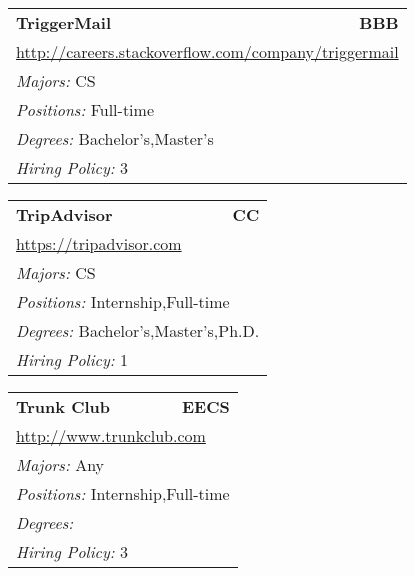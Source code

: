 \documentclass[twoside]{article}
\begin{document}
\begin{center}
\begin{multicols}{3}
\begin{FlushLeft}
\begin{minipage}{.9\columnwidth}
\end{minipage}
 
\begin{minipage}{.9\columnwidth}\begin{tabularx}{.95\columnwidth}{Xr}
                 {\Large\bf TriggerMail} & {\Large\bf BBB}\\
    \multicolumn{2}{p{.95\columnwidth}}{\url{http://careers.stackoverflow.com/company/triggermail}}\\
    \multicolumn{2}{p{.95\columnwidth}}{\emph{Majors:} CS}\\
    \multicolumn{2}{p{.95\columnwidth}}{\emph{Positions:} Full-time}\\
    \multicolumn{2}{p{.95\columnwidth}}{\emph{Degrees:} Bachelor's,Master's}\\
    \multicolumn{2}{p{.95\columnwidth}}{\emph{Hiring Policy:} 3}\\
    \end{tabularx}
    
\end{minipage}
 
\begin{minipage}{.9\columnwidth}\begin{tabularx}{.95\columnwidth}{Xr}
                 {\Large\bf TripAdvisor} & {\Large\bf CC}\\
    \multicolumn{2}{p{.95\columnwidth}}{\url{https://tripadvisor.com}}\\
    \multicolumn{2}{p{.95\columnwidth}}{\emph{Majors:} CS}\\
    \multicolumn{2}{p{.95\columnwidth}}{\emph{Positions:} Internship,Full-time}\\
    \multicolumn{2}{p{.95\columnwidth}}{\emph{Degrees:} Bachelor's,Master's,Ph.D.}\\
    \multicolumn{2}{p{.95\columnwidth}}{\emph{Hiring Policy:} 1}\\
    \end{tabularx}
    
\end{minipage}
 
\begin{minipage}{.9\columnwidth}\begin{tabularx}{.95\columnwidth}{Xr}
                 {\Large\bf Trunk Club} & {\Large\bf EECS}\\
    \multicolumn{2}{p{.95\columnwidth}}{\url{http://www.trunkclub.com}}\\
    \multicolumn{2}{p{.95\columnwidth}}{\emph{Majors:} Any}\\
    \multicolumn{2}{p{.95\columnwidth}}{\emph{Positions:} Internship,Full-time}\\
    \multicolumn{2}{p{.95\columnwidth}}{\emph{Degrees:} }\\
    \multicolumn{2}{p{.95\columnwidth}}{\emph{Hiring Policy:} 3}\\
    \end{tabularx}
    

\end{minipage}
\end{FlushLeft}
\end{multicols}
\end{center}
\end{document}

